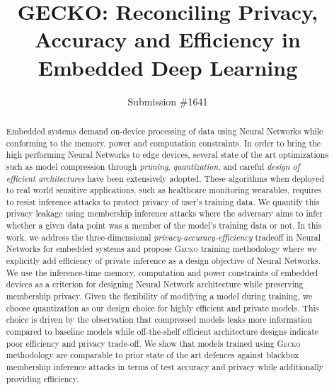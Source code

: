 \documentclass[sigconf]{acmart}
\newcommand{\method}{{\scshape Gecko}}
\begin{document}
\title{GECKO: Reconciling Privacy, Accuracy and Efficiency in Embedded Deep Learning}

\author{Submission \#1641}


\begin{abstract}
Embedded systems demand on-device processing of data using Neural Networks while conforming to the memory, power and computation constraints.
In order to bring the high performing Neural Networks to edge devices, several state of the art optimizations such as model compression through \textit{pruning}, \textit{quantization}, and careful \textit{design of efficient architectures} have been extensively adopted.
These algorithms when deployed to real world sensitive applications, such as healthcare monitoring wearables, requires to resist inference attacks to protect privacy of user's training data.
We quantify this privacy leakage using membership inference attacks where the adversary aims to infer whether a given data point was a member of the model's training data or not.
In this work, we address the three-dimensional \textit{privacy-accuracy-efficiency} tradeoff in Neural Networks for embedded systems and propose \method\hspace{0.02in} training methodology where we explicitly add efficiency of private inference as a design objective of Neural Networks.
We use the inference-time memory, computation and power constraints of embedded devices as a criterion for designing Neural Network architecture while preserving membership privacy.
Given the flexibility of modifying a model during training, we choose quantization as our design choice for highly efficient and private models.
This choice is driven by the observation that compressed models leaks more information compared to baseline models while off-the-shelf efficient architecture designs indicate poor efficiency and privacy trade-off.
We show that models trained using \method\hspace{0.02in} methodology are comparable to prior state of the art defences against blackbox membership inference attacks in terms of test accuracy and privacy while additionally providing efficiency.
\end{abstract}

\maketitle





%
%






%
%



\end{document}
